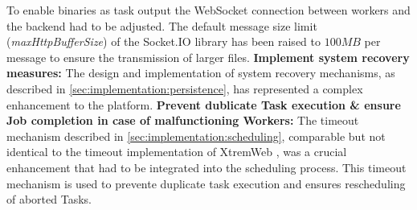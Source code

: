 To enable binaries as task output the WebSocket connection between workers and the backend had to be adjusted. The default message size limit (\emph{maxHttpBufferSize}) of the Socket.IO \cite{methodology:websockets2} library has been raised to $100MB$ per message to ensure the transmission of larger files.
\newline
\newline
\textbf{Implement system recovery measures:}
\newline
The design and implementation of system recovery mechanisms, as described in \autoref{sec:implementation:persistence}, has represented a complex enhancement to the platform.
\newline
\newline
\textbf{Prevent dublicate Task execution \& ensure Job completion in case of malfunctioning Workers:}
\newline
The timeout mechanism described in \autoref{sec:implementation:scheduling}, comparable but not identical to the timeout implementation of XtremWeb \cite{relatedwork:xtremweb}, was a crucial enhancement that had to be integrated into the scheduling process. This timeout mechanism is used to prevente duplicate task execution and ensures rescheduling of aborted Tasks.